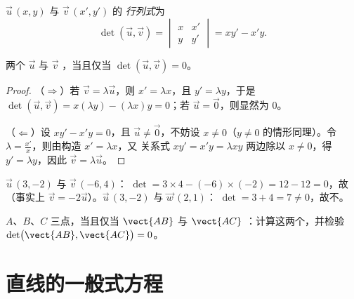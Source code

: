 \begin{definition}[行列式]\label{def:g11:vect:det}
 $\vec u\,(x, y)$ 与 $\vec v\,(x', y')$ 的
\emph{行列式}为
\[
\det(\vec u, \vec v) =
\begin{vmatrix} x & x' \\ y & y' \end{vmatrix}
= x y' - x' y .
\]
\end{definition}

\begin{theorem}[共线判定准则]\label{thm:g11:vect:collinearity}
两个 $\vec u$ 与 $\vec v$ ，当且仅当
$\det(\vec u, \vec v) = 0$。
\end{theorem}

\begin{proof}
（$\Rightarrow$）若 $\vec v = \lambda\vec u$，则 $x' = \lambda x$，且
$y' = \lambda y$，于是
$\det(\vec u, \vec v) = x(\lambda y) - (\lambda x)y = 0$；若
$\vec u = \vec 0$，则显然为 $0$。

（$\Leftarrow$）设 $xy' - x'y = 0$，且 $\vec u \neq \vec 0$，不妨设
$x \neq 0$（$y \neq 0$ 的情形同理）。令
$\lambda = \frac{x'}{x}$，则由构造 $x' = \lambda x$，又
关系式 $xy' = x'y = \lambda x y$ 两边除以 $x \neq 0$，得
$y' = \lambda y$，因此 $\vec v = \lambda \vec u$。
\end{proof}

\begin{example}\label{ex:g11:vect:collinear}
$\vec u\,(3, -2)$ 与 $\vec v\,(-6, 4)$：
$\det = 3 \times 4 - (-6) \times (-2) = 12 - 12 = 0$，故（事实上
$\vec v = -2\vec u$）。$\vec u\,(3, -2)$ 与 $\vec w\,(2, 1)$：
$\det = 3 + 4 = 7 \neq 0$，故不。
\end{example}

\begin{method}[三点共线]\label{met:g11:vect:alignment}
$A$、$B$、$C$ 三点，当且仅当 $\vect{AB}$ 与 $\vect{AC}$
：计算这两个，并检验
$\det\bigl(\vect{AB}, \vect{AC}\bigr) = 0$。
\end{method}

\section{直线的一般式方程}

